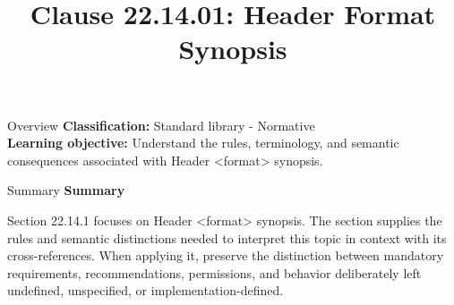 \documentclass[10pt,letterpaper]{article}
\title{Clause 22.14.01: Header Format Synopsis}
\author{}
\date{}
\begin{document}
\maketitle
\begin{CornellOverviewBox}{Overview}
\textbf{Classification:} Standard library - Normative\\[2pt]
\textbf{Learning objective:} Understand the rules, terminology, and semantic consequences associated with Header <format> synopsis.
\end{CornellOverviewBox}\begin{CornellSummaryBox}{Summary}
{\sffamily\bfseries\color{Accent} Summary}\par\vspace{3pt}Section 22.14.1 focuses on Header <format> synopsis. The section supplies the rules and semantic distinctions needed to interpret this topic in context with its cross-references. When applying it, preserve the distinction between mandatory requirements, recommendations, permissions, and behavior deliberately left undefined, unspecified, or implementation-defined.
\end{CornellSummaryBox}
\end{document}
